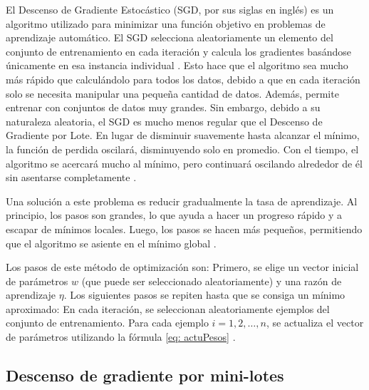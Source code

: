 El Descenso de Gradiente Estocástico (SGD, por sus siglas en inglés) es un algoritmo utilizado para minimizar una función objetivo en problemas de aprendizaje automático. El SGD selecciona aleatoriamente un elemento del conjunto de entrenamiento en cada iteración y calcula los gradientes basándose únicamente en esa instancia individual \citep{pajares2021aprendizaje}. Esto hace que el algoritmo sea mucho más rápido que calculándolo para todos los datos, debido a que en cada iteración solo se necesita manipular una pequeña cantidad de datos. Además, permite entrenar con conjuntos de datos muy grandes. Sin embargo, debido a su naturaleza aleatoria, el SGD es mucho menos regular que el Descenso de Gradiente por Lote. En lugar de disminuir suavemente hasta alcanzar el mínimo, la función de perdida oscilará, disminuyendo solo en promedio. Con el tiempo, el algoritmo se acercará mucho al mínimo, pero continuará oscilando alrededor de él sin asentarse completamente \citep{geron2022hands}.

Una solución a este problema es reducir gradualmente la tasa de aprendizaje. Al principio, los pasos son grandes, lo que ayuda a hacer un progreso rápido y a escapar de mínimos locales. Luego, los pasos se hacen más pequeños, permitiendo que el algoritmo se asiente en el mínimo global \citep{geron2022hands}.


Los pasos de este método de optimización son: Primero, se elige un vector inicial de parámetros \( w \) (que puede ser seleccionado aleatoriamente) y una razón de aprendizaje \( \eta \). Los siguientes pasos se repiten hasta que se consiga un mínimo aproximado: En cada iteración, se seleccionan aleatoriamente ejemplos del conjunto de entrenamiento. Para cada ejemplo \( i = 1, 2, \ldots, n \), se actualiza el vector de parámetros utilizando la fórmula \ref{eq: actuPesos} \citep{pajares2021aprendizaje}.


\subsection{Descenso de gradiente por mini-lotes}


